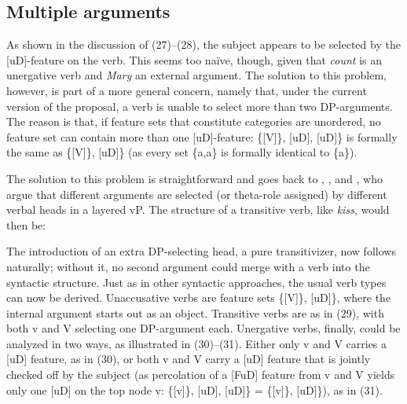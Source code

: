 \documentclass[output=paper
,modfonts
,nonflat]{langsci/langscibook}
\begin{document}
\subsection{Multiple arguments}
As shown in the discussion of (27)–(28), the subject appears to be selected by the [uD]-feature on the verb. This seems too naïve, though, given that \textit{count} is an unergative verb and \textit{Mary} an external argument. The solution to this problem, however, is part of a more general concern, namely that, under the current version of the proposal, a verb is unable to select more than two DP-arguments. The reason is that, if feature sets that constitute categories are unordered, no feature set can contain more than one [uD]-feature: \{[V]\}, [uD], [uD]\} is formally the same as \{[V]\}, [uD]\} (as every set \{a,a\} is formally identical to \{a\}).

The solution to this problem is straightforward and goes back to \citet{Larsson1988},  \citet{Hale_Keyser1993}, and \citet{Kratzer1996}, who argue that different arguments are selected (or theta-role assigned) by different verbal heads in a layered vP. The structure of a transitive verb, like \textit{kiss}, would then be: 

\begin{figure}[!h]
	\begin{exe}
	\end{exe}
\end{figure}
\noindent The introduction of an extra DP-selecting head, a pure transitivizer, now follows naturally; without it, no second argument could merge with a verb into the syntactic structure. Just as in other syntactic approaches, the usual verb types can now be derived. Unaccusative verbs are feature sets \{[V]\}, [uD]\}, where the internal argument starts out as an object. Transitive verbs are as in (29), with both v and V selecting one DP-argument each. Unergative verbs, finally, could be analyzed in two ways, as illustrated in (30)–(31). Either only v and V carries a [uD] feature, as in (30), or both v and V carry a [uD] feature that is jointly checked off by the subject (as percolation of a [FuD] feature from v and V yields only one [uD] on the top node v: \{[v]\}, [uD], [uD]\} = \{[v]\}, [uD]\}), as in (31).
\end{document}

